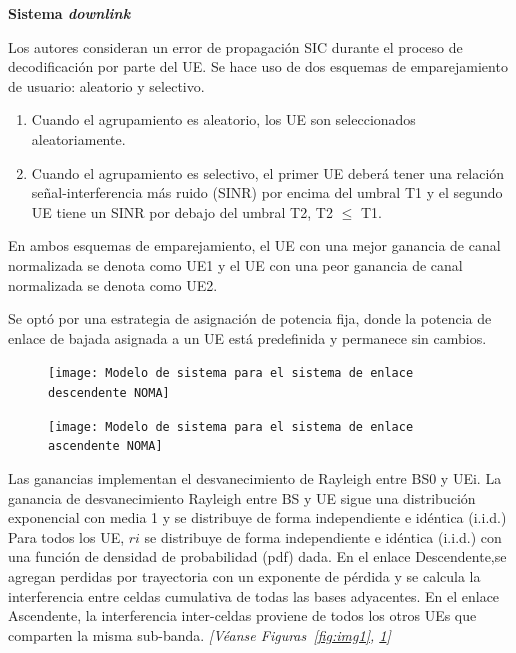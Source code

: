 \textbf{Sistema \textit{downlink}}\newline

Los autores consideran un error de propagación SIC durante el proceso de decodificación por parte del UE. Se hace uso de dos esquemas de emparejamiento de usuario: aleatorio y selectivo.\newline

\begin{enumerate}
\item  Cuando el agrupamiento es aleatorio, los UE son seleccionados aleatoriamente.
\item  Cuando el agrupamiento es selectivo, el primer UE deberá tener una relación señal-interferencia más ruido (SINR) por encima del umbral T1 y el segundo UE tiene un SINR por debajo del umbral T2, T2 $\mathrm{\le}$ T1.
\end{enumerate}

En ambos esquemas de emparejamiento, el UE con una mejor ganancia de canal normalizada se denota como UE1 y el UE con una peor ganancia de canal normalizada se denota como UE2.\newline

Se optó por una estrategia de asignación de potencia fija, donde la potencia de enlace de bajada asignada a un UE está predefinida y permanece sin cambios.\newline


\begin{figure}
\centering
\begin{minipage}{.45\linewidth}
  \texttt{[image: Modelo de sistema para el sistema de enlace descendente NOMA]}
  \label{fig:img1}
\end{minipage}
\hspace{.05\linewidth}
\begin{minipage}{.45\linewidth}
  \texttt{[image: Modelo de sistema para el sistema de enlace ascendente NOMA]}
  \label{fig:img2}
\end{minipage}
\end{figure}

Las ganancias implementan el desvanecimiento de Rayleigh entre BS0 y UEi. La ganancia de desvanecimiento Rayleigh entre BS y UE sigue una distribución exponencial con media 1 y se distribuye de forma independiente e idéntica (i.i.d.)\newline
Para todos los UE, ${ri}$ se distribuye de forma independiente e idéntica (i.i.d.) con una función de densidad de probabilidad (pdf) dada.\newline
En el enlace Descendente,se agregan perdidas por trayectoria con un exponente de pérdida y se calcula la interferencia entre celdas cumulativa de todas las bases adyacentes.\newline
En el enlace Ascendente, la interferencia inter-celdas proviene de todos los otros UEs que comparten la misma sub-banda. \textit{[Véanse Figuras~\ref{fig:img1}, \ref{fig:img2}]}



